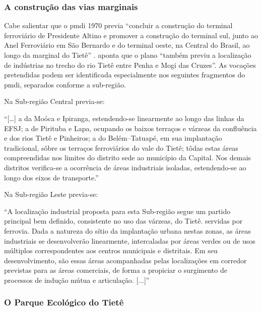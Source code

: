 \documentclass[
article,			%
11pt,				%
oneside,			%
a4paper,			%
english,			%
brazil,				%
sumario=tradicional
]{abntex2}
\begin{document}
	\subsubsection{A construção das vias marginais} \label{s3:marginaltiete}
	
	Cabe salientar que o \gls{pmdi} 1970 previa ``concluir a construção do terminal ferroviário de Presidente Altino e promover a construção do terminal sul, junto ao Anel Ferroviário em São Bernardo e do terminal oeste, na Central do Brasil, ao longo da marginal do Tietê'' \cite[p. XVIII]{gegran1970a}.  aponta que o plano ``também previu a localização de indústrias no trecho do rio Tietê entre Penha e Mogi das Cruzes''. As vocações pretendidas podem ser identificada especialmente nos seguintes fragmentos do \gls{pmdi}, separados conforme a sub-região.
	
	Na Sub-região Central previa-se:
	
	\begin{citacao}
		``[\dots] a da Moóca e Ipiranga, estendendo-se linearmente ao longo das linhas da EFSJ; a de Pirituba e Lapa, ocupando os baixos terraços e várzeas da confluência e dos rios Tietê e Pinheiros; a do Belém--Tatuapé, em sua implantação tradicional, sôbre os terraços ferroviários do vale do Tietê; tôdas estas áreas compreendidas nos limites do distrito sede ao município da Capital. Nos demais distritos verifica-se a ocorrência de áreas industriais isoladas, estendendo-se ao longo dos eixos de transporte.'' \cite[p. 9]{gegran1970a}
	\end{citacao}
	
	Na Sub-região Leste previa-se:
	
	\begin{citacao}
		``A localização industrial proposta para esta Sub-região segue um partido principal bem definido, consistente no uso das várzeas, do Tietê. servidas por ferrovia. Dada a natureza do sítio da implantação urbana nestas zonas, as áreas industriais
		se desenvolverão linearmente, intercaladas por áreas verdes ou de usos múltiplos correspondentes aos centros municipais e distritais. Em seu desenvolvimento, são essas áreas acompanhadas pelas localizações em corredor previstas para as áreas comerciais, de forma a propiciar o surgimento de processos de indução mútua e articulação. [...]'' \cite[p. 9]{gegran1970a}
	\end{citacao}
	
	\subsubsection{O Parque Ecológico do Tietê} \label{s3:pet}
	
\end{document}
